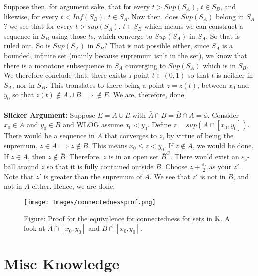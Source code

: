 \documentclass[../Main.tex]{subfiles}
\begin{document}
{Suppose then, for argument sake, that for every $t>Sup(S_A)$, $t\in S_B$, and
likewise, for every $t<Inf(S_B)$. $t \in S_A$. Now then, does $Sup(S_A)$ belong
in $S_A$? we see that for every $t>sup(S_A)$, $t \in S_B$ which means we can construct a sequence in $S_B$ using those $t$s, which converge to $Sup(S_A)$ in $S_A$. So that is ruled out.
So is $Sup(S_A)$ in $S_B$? That is not possible either, since $S_A$ is a bounded, infinite set (mainly because supremum isn't in the set), we know that there is a monotone subsequence in $S_A$ converging to $Sup(S_A)$ which is in $S_B$. We therefore conclude that, there exists a point $t \in (0,1)$ so that $t$ is neither in $S_A$, nor in $S_B$. This translates to there being a point $z=z(t)$, between $x_0$ and $y_0$ so that $z(t)\not\in A \cup B \implies \not\in E$. We are, therefore, done. 
\\\\ \textbf{Slicker Argument:} Suppose $E=A \cup B$ with $\bar{A}\cap B=\bar{B} \cap A=\phi$. Consider $x_0 \in A$ and $y_0 \in B$ and WLOG assume $x_0<y_0$. Define $z=sup(A\cap[x_0,y_0])$.
There would be a sequence in $A$ that converges to $z$, by virtue of being the supremum. $z \in \bar{A} \implies z \not\in B$. This means $x_0 \leq z<y_0$. If $z \not\in A$, we would be done.
If $z \in A$, then $z \not\in \bar{B}$. Therefore, $z$ is in an open set $\bar{B}^C$. There would exist
an $\varepsilon_z$-ball around $z$ so that it is fully contained outside $\bar{B}$. Choose $z+\frac{\varepsilon_z}{2}$ as your $z'$.
Note that $z'$ is greater than the supremum of $A$. We see that $z'$ is not in $B$, and not in $A$ either. Hence, we are done.
}

\begin{figure}[h]
    \centering
    \texttt{[image: Images/connectednessprof.png]}
    \caption{Figure: Proof for the equivalence for connectedness for sets in $\mathbb R$. A look at $A\cap[x_0,y_0]$ and $B\cap [x_0,y_0]$.}
    \label{fig:contced}
\end{figure}

\section{Misc Knowledge}
\end{document}
